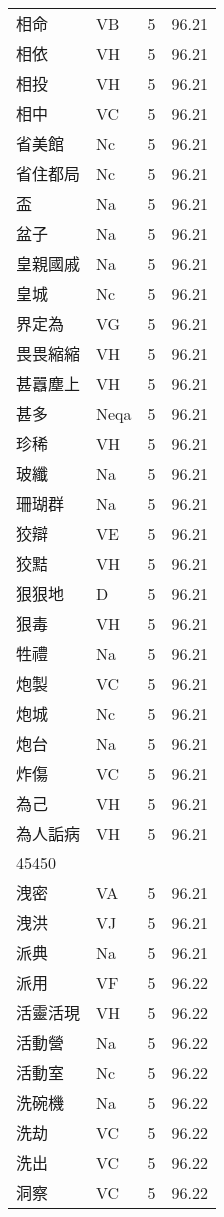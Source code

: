 \documentclass[twocolumn]{book}
\begin{document}
\begin{supertabular}{llrr}
相命 & VB & 5 &  96.21\\
相依 & VH & 5 &  96.21\\
相投 & VH & 5 &  96.21\\
相中 & VC & 5 &  96.21\\
省美館 & Nc & 5 &  96.21\\
省住都局 & Nc & 5 &  96.21\\
盃 & Na & 5 &  96.21\\
盆子 & Na & 5 &  96.21\\
皇親國戚 & Na & 5 &  96.21\\
皇城 & Nc & 5 &  96.21\\
界定為 & VG & 5 &  96.21\\
畏畏縮縮 & VH & 5 &  96.21\\
甚囂塵上 & VH & 5 &  96.21\\
甚多 & Neqa & 5 &  96.21\\
珍稀 & VH & 5 &  96.21\\
玻纖 & Na & 5 &  96.21\\
珊瑚群 & Na & 5 &  96.21\\
狡辯 & VE & 5 &  96.21\\
狡黠 & VH & 5 &  96.21\\
狠狠地 & D & 5 &  96.21\\
狠毒 & VH & 5 &  96.21\\
牲禮 & Na & 5 &  96.21\\
炮製 & VC & 5 &  96.21\\
炮城 & Nc & 5 &  96.21\\
炮台 & Na & 5 &  96.21\\
炸傷 & VC & 5 &  96.21\\
為己 & VH & 5 &  96.21\\
為人詬病 & VH & 5 &  96.21\\
45450\\
洩密 & VA & 5 &  96.21\\
洩洪 & VJ & 5 &  96.21\\
派典 & Na & 5 &  96.21\\
派用 & VF & 5 &  96.22\\
活靈活現 & VH & 5 &  96.22\\
活動營 & Na & 5 &  96.22\\
活動室 & Nc & 5 &  96.22\\
洗碗機 & Na & 5 &  96.22\\
洗劫 & VC & 5 &  96.22\\
洗出 & VC & 5 &  96.22\\
洞察 & VC & 5 &  96.22\\

\end{supertabular}
\end{document}
